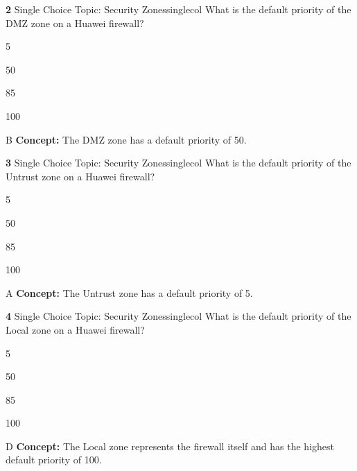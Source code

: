 \documentclass[10pt,a4paper]{article}
\begin{document}
\begin{qcard}{\color{white}\textbf{2} \hfill \small Single Choice \textbar{} Topic: Security Zones}{singlecol}
What is the default priority of the DMZ zone on a Huawei firewall?

\begin{qoptions}
\item 5
\item 50
\item 85
\item 100
\end{qoptions}
\begin{explainbox}{B}
\textbf{Concept:} The DMZ zone has a default priority of 50.
\end{explainbox}
\end{qcard}

\begin{qcard}{\color{white}\textbf{3} \hfill \small Single Choice \textbar{} Topic: Security Zones}{singlecol}
What is the default priority of the Untrust zone on a Huawei firewall?

\begin{qoptions}
\item 5
\item 50
\item 85
\item 100
\end{qoptions}
\begin{explainbox}{A}
\textbf{Concept:} The Untrust zone has a default priority of 5.
\end{explainbox}
\end{qcard}

\begin{qcard}{\color{white}\textbf{4} \hfill \small Single Choice \textbar{} Topic: Security Zones}{singlecol}
What is the default priority of the Local zone on a Huawei firewall?

\begin{qoptions}
\item 5
\item 50
\item 85
\item 100
\end{qoptions}
\begin{explainbox}{D}
\textbf{Concept:} The Local zone represents the firewall itself and has the highest default priority of 100.
\end{explainbox}
\end{qcard}
\end{document}
